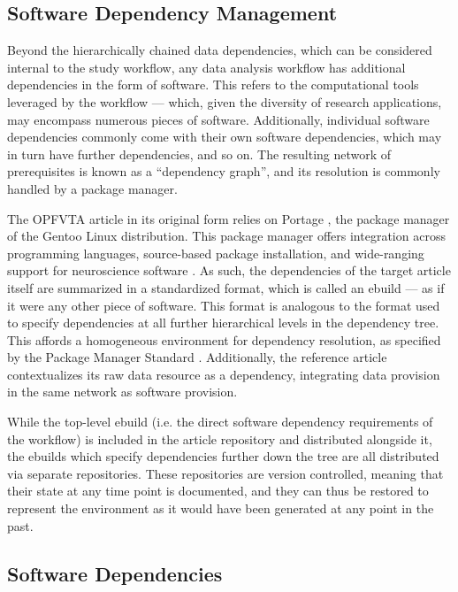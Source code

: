 \subsection{Software Dependency Management}

Beyond the hierarchically chained data dependencies, which can be considered internal to the study workflow, any data analysis workflow has additional dependencies in the form of software.
This refers to the computational tools leveraged by the workflow — which, given the diversity of research applications, may encompass numerous pieces of software.
Additionally, individual software dependencies commonly come with their own software dependencies, which may in turn have further dependencies, and so on.
The resulting network of prerequisites is known as a “dependency graph”, and its resolution is commonly handled by a package manager.

The OPFVTA article in its original form relies on Portage \cite{portage}, the package manager of the Gentoo Linux distribution.
This package manager offers integration across programming languages, source-based package installation, and wide-ranging support for neuroscience software \cite{ng}.
As such, the dependencies of the target article itself are summarized in a standardized format, which is called an ebuild — as if it were any other piece of software.
This format is analogous to the format used to specify dependencies at all further hierarchical levels in the dependency tree.
This affords a homogeneous environment for dependency resolution, as specified by the Package Manager Standard \cite{pms}.
Additionally, the reference article contextualizes its raw data resource as a dependency, integrating data provision in the same network as software provision.

While the top-level ebuild (i.e. the direct software dependency requirements of the workflow) is included in the article repository and distributed alongside it, the ebuilds which specify dependencies further down the tree are all distributed via separate repositories.
These repositories are version controlled, meaning that their state at any time point is documented, and they can thus be restored to represent the environment as it would have been generated at any point in the past.


\subsection{Software Dependencies}

